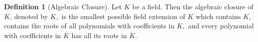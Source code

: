 \documentclass{article}
\newtheorem{theorem}{Theorem}[section]
\theoremstyle{definition}
\newtheorem{definition}{Definition}[section]
\theoremstyle{definition}
\theoremstyle{definition}
\begin{document}

\begin{definition} [Algebraic Closure]
    Let $K$ be a field. Then the algebraic closure of $K$, denoted by $\overline{K},$ is the smallest possible field extension of $K$ which contains $K,$ contains the roots of all polynomials with coefficients in $K,$ and every polynomial with coefficients in $\overline{K}$ has all its roots in $\overline{K}.$
\end{definition}
\end{document}
